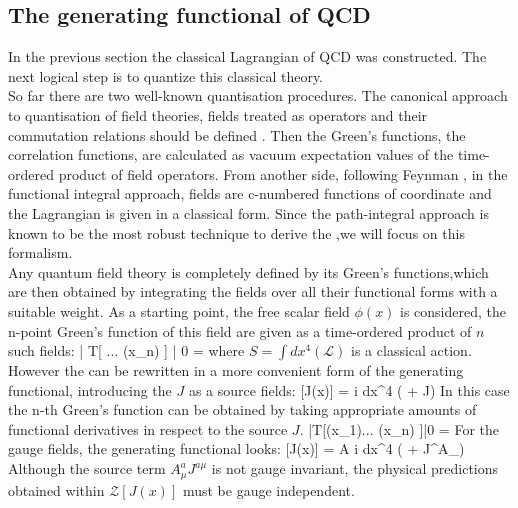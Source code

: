 	\subsection*{The generating functional of QCD}
	In the previous section the classical Lagrangian of QCD \Eq{\ref{qcd_low:L_QCD}} was constructed. The next logical step is to quantize this classical theory. \\
	
	So far there are two well-known quantisation procedures. The canonical approach to quantisation of field theories, fields treated as operators and their commutation relations should be defined  . Then the Green's functions, the correlation functions, are calculated as vacuum expectation values of the time-ordered product of field operators. From another side, following Feynman , in the functional integral approach, fields are c-numbered functions of coordinate and the Lagrangian is given in a classical form. Since the path-integral approach is known to be the most robust technique to derive the \DS ,we will focus on this formalism.   \\

Any quantum field theory is completely defined by its Green's functions,which are then obtained by integrating the fields over all their functional forms with a suitable weight. As a starting point, the free scalar field $\phi(x)$ is considered, the n-point Green's function of this field are given as a time-ordered product of $n$ such fields: 
	\beqa
		\label{qcd_low:Green_func}
		 | T[ ... \hat \phi(x_n) ] | 0 \rangle  = 
	\eeqa
where $S=\int dx^4( \mathcal{L} )$ is a classical action. However the \Eq{\ref{qcd_low:Green_func}} can be rewritten in a more convenient form of the generating functional, introducing the $J$ as a source fields:
    \beqa
        \label{qcd_low:Gen_functional_scal}
         [J(x)] = \int {} \phi \;  \left\lbrace i \int dx^4 (   + J\phi)\right\rbrace 
    \eeqa
In this case the n-th Green's function can be obtained by taking appropriate amounts of functional derivatives in respect to the source $J$. 
    \beqa
         |T[\hat \phi(x_1)... \hat \phi(x_n) ]|0 \rangle =  
   \eeqa
For the gauge fields, the generating functional looks:
    \beqa
    	\label{qcd_low:Gen_functional_vec}
        [J(x)] = \int {} A \;  \left\lbrace i \int dx^4 (   + J^\mu A_\mu )\right\rbrace 
    \eeqa
Although the source term $A^a_\mu J^{a \mu}$ is not gauge invariant, the physical predictions obtained within $\mathcal{Z}[J(x)]$ must be gauge independent. \\

